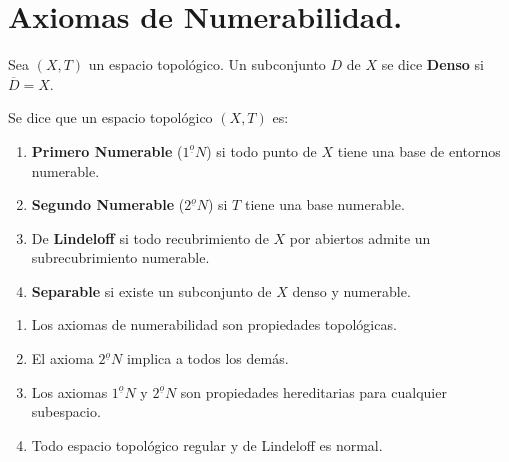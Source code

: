 \documentclass[cursovd_portada.tex]{subfiles}
\begin{document}
\section{Axiomas de Numerabilidad.}
\begin{defi}
Sea $(X,T)$ un espacio topológico. Un subconjunto $D$ de $X$ se dice {\bf Denso} si $\overline{D}=X$.
\end{defi}
\begin{defi}
Se dice que un espacio topológico $(X,T)$ es:
\begin{enumerate}
\item {\bf Primero Numerable} ($1^{\underline{o}}N$) si todo punto de $X$ tiene una base de entornos numerable.
\item {\bf Segundo Numerable} ($2^{\underline{o}}N$) si $T$ tiene una base numerable.
\item De {\bf Lindeloff} si todo recubrimiento de $X$ por abiertos admite un subrecubrimiento numerable.
\item {\bf Separable} si existe un subconjunto de $X$ denso y numerable.
\end{enumerate}
\end{defi}
\begin{prop}
\begin{enumerate}
\item Los axiomas de numerabilidad son propiedades to\-po\-ló\-gi\-cas.
\item El axioma $2^{\underline{o}}N$ implica a todos los demás.
\item Los axiomas $1^{\underline{o}}N$ y $2^{\underline{o}}N$ son propiedades hereditarias para cualquier subespacio.
\item Todo espacio topológico regular y de Lindeloff es normal.
\end{enumerate}
\end{prop}
\end{document}
